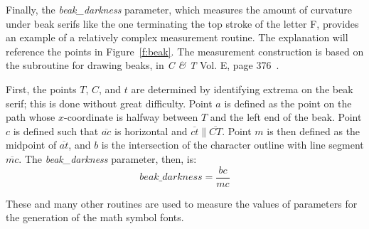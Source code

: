Finally, the \emph{beak\_darkness} parameter, which measures the amount of
curvature under beak serifs like the one terminating the top stroke of the
letter F, provides an example of a relatively complex measurement routine.
The explanation will reference the points in Figure~\ref{f:beak}. The
measurement construction is based on the subroutine for drawing beaks, in
\emph{C \& T} Vol. E, page 376~\cite{cte}.

First, the points $T$, $C$, and $t$ are determined by identifying extrema on the
beak serif; this is done without great difficulty. Point $a$ is defined as the
point on the path whose $x$-coordinate is halfway between $T$ and the left end
of the beak. Point $c$ is defined such that $\overline{ac}$ is horizontal and
$\overline{ct}\mathbin\|\overline{CT}$. Point $m$ is then defined as the midpoint of
$\overline{at}$, and $b$ is the intersection of the character outline with line
segment $\overline{mc}$. The \emph{beak\_darkness} parameter, then, is:
\[
\mathit{beak\_darkness} = \frac{bc}{mc}
\]

These and many other routines are used to measure the values of parameters for
the generation of the math symbol fonts.
